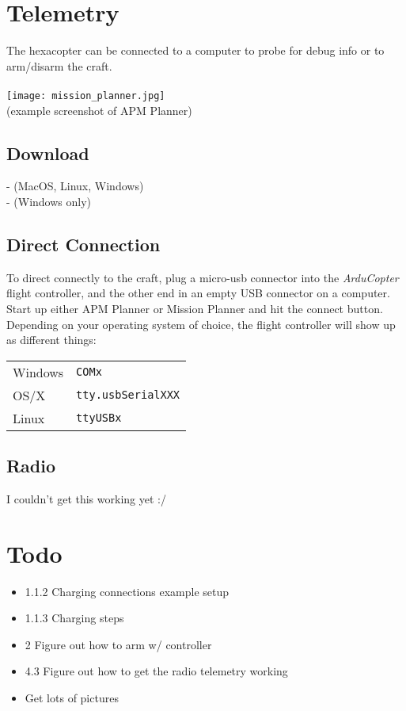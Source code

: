\documentclass{style}
\begin{document}
\section{Telemetry}
The hexacopter can be connected to a computer to probe for debug info or to arm/disarm the craft. \\ \\
\texttt{[image: mission\_planner.jpg]} \\
(example screenshot of APM Planner)
\subsection{Download}
 - (MacOS, Linux, Windows) \\
 - (Windows only)
\subsection{Direct Connection}
To direct connectly to the craft, plug a micro-usb connector into the \textit{ArduCopter} flight controller, and the other end in an empty USB connector on a computer.
Start up either APM Planner or Mission Planner and hit the connect button.
Depending on your operating system of choice, the flight controller will show up as different things:
\newline
\newline
\begin{tabular}{ l l }
  Windows & \texttt{COMx} \\
  OS/X & \texttt{tty.usbSerialXXX} \\
  Linux & \texttt{ttyUSBx}
\end{tabular}
\subsection{Radio}
I couldn't get this working yet :/
\pagebreak
\section{Todo}
\begin{itemize}
\item 1.1.2 Charging connections example setup
\item 1.1.3 Charging steps
\item 2 Figure out how to arm w/ controller
\item 4.3 Figure out how to get the radio telemetry working
\item Get lots of pictures
\end{itemize}
\end{document}
